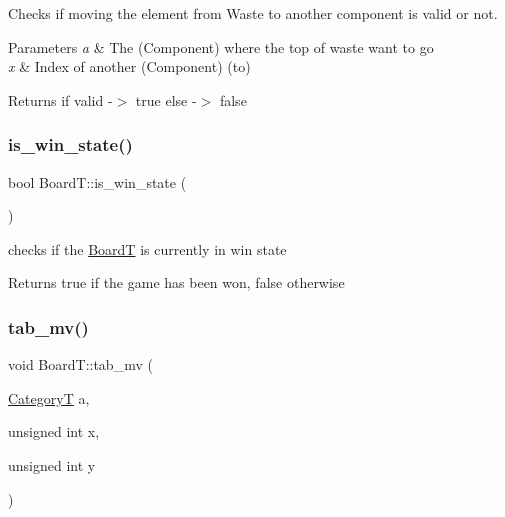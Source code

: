 Checks if moving the element from Waste to another component is valid or not. 


\begin{DoxyParams}{Parameters}
{\em a} & The (Component) where the top of waste want to go \\
\hline
{\em x} & Index of another (Component) (to) \\
\hline
\end{DoxyParams}
\begin{DoxyReturn}{Returns}
if valid -\/$>$ true else -\/$>$ false 
\end{DoxyReturn}
\mbox{\label{class_board_t_a163bed593a3f0ba24dd5401b595b75cd}} 
\subsubsection{\texorpdfstring{is\_win\_state()}{is\_win\_state()}}
{\footnotesize\ttfamily bool Board\+T\+::is\+\_\+win\+\_\+state (\begin{DoxyParamCaption}{ }\end{DoxyParamCaption})}



checks if the \mbox{\hyperlink{class_board_t}{BoardT}} is currently in win state 

\begin{DoxyReturn}{Returns}
true if the game has been won, false otherwise 
\end{DoxyReturn}
\mbox{\label{class_board_t_af55f68f106f0da464c9c5b9dc152f9a8}} 
\subsubsection{\texorpdfstring{tab\_mv()}{tab\_mv()}}
{\footnotesize\ttfamily void Board\+T\+::tab\+\_\+mv (\begin{DoxyParamCaption}\item[{\mbox{\hyperlink{_card_types_8h_aa77f81f8d4c8aa57046a50ca32d6b7b4}{CategoryT}}}]{a,  }\item[{unsigned int}]{x,  }\item[{unsigned int}]{y }\end{DoxyParamCaption})}



